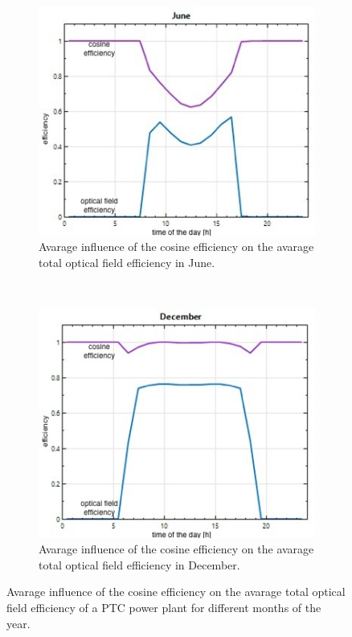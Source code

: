\begin{figure}[!htbp]
        \centering                
        \begin{subfigure}[b]{0.5\textwidth}
                \centering
                \includegraphics[width=1\textwidth]{FIG/PTC_field_eff_winter}
                \caption{Avarage influence of the cosine efficiency on the avarage total optical field efficiency in June.}\label{PTC_field_eff_winter}
        \end{subfigure}%
        ~
        \begin{subfigure}[b]{0.5\textwidth}
                \centering
                \includegraphics[width=1\textwidth]{FIG/PTC_field_eff_summer}
                \caption{Avarage influence of the cosine efficiency on the avarage total optical field efficiency in December.}\label{PTC_field_eff_summer}
        \end{subfigure}
        \caption[Avarage influence of the cosine efficiency on the avarage total optical field efficiency of a PTC power plant for different months of the year.]{Avarage influence of the cosine efficiency on the avarage total optical field efficiency of a PTC power plant for different months of the year.}\label{PTC_field_eff}
\end{figure}
